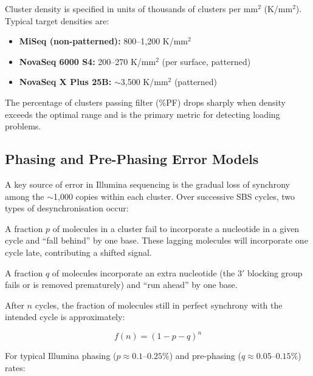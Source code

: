 \begin{keyconcept}[title={Cluster Density and Data Quality}]
Cluster density is specified in units of thousands of clusters per mm$^2$ (K/mm$^2$). Typical target densities are:
\begin{itemize}[nosep]
  \item \textbf{MiSeq (non-patterned):} 800--1,200 K/mm$^2$
  \item \textbf{NovaSeq 6000 S4:} 200--270 K/mm$^2$ (per surface, patterned)
  \item \textbf{NovaSeq X Plus 25B:} $\sim$3,500 K/mm$^2$ (patterned)
\end{itemize}
The percentage of clusters passing filter (\%PF) drops sharply when density exceeds the optimal range and is the primary metric for detecting loading problems.
\end{keyconcept}


\subsection{Phasing and Pre-Phasing Error Models}
\label{subsec:shortread:phasing}

A key source of error in Illumina sequencing is the gradual loss of synchrony among the $\sim$1,000 copies within each cluster. Over successive SBS cycles, two types of desynchronisation occur:

\begin{description}[style=nextline, itemsep=3pt]
  \item[Phasing (lagging)] A fraction $p$ of molecules in a cluster fail to incorporate a nucleotide in a given cycle and ``fall behind'' by one base. These lagging molecules will incorporate one cycle late, contributing a shifted signal.
  \item[Pre-phasing (leading)] A fraction $q$ of molecules incorporate an extra nucleotide (the 3$'$ blocking group fails or is removed prematurely) and ``run ahead'' by one base.
\end{description}

After $n$ cycles, the fraction of molecules still in perfect synchrony with the intended cycle is approximately:

\begin{equation}
f(n) = (1 - p - q)^n
\label{eq:shortread:phasing}
\end{equation}

For typical Illumina phasing ($p \approx 0.1$--$0.25\%$) and pre-phasing ($q \approx 0.05$--$0.15\%$) rates:

